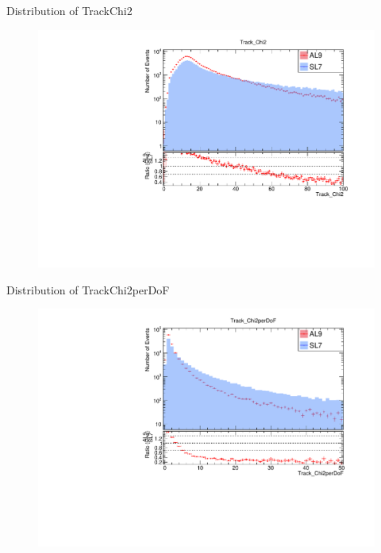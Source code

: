 \begin{frame}{Distribution of TrackChi2}
    \begin{figure}
        \includegraphics[width=\linewidth]{./output/Track_Chi2.pdf}
    \end{figure}
\end{frame}

\begin{frame}{Distribution of TrackChi2perDoF}
    \begin{figure}
        \includegraphics[width=\linewidth]{./output/Track_Chi2perDoF.pdf}
    \end{figure}
\end{frame}

